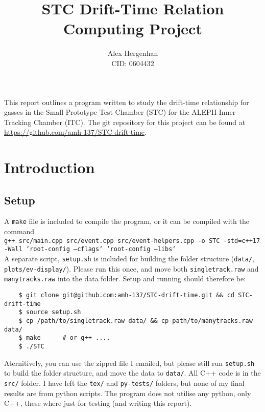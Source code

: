 \documentclass[11pt]{article}
\begin{document}
\title{STC Drift-Time Relation\\\normalsize Computing Project}
\author{Alex Hergenhan\\CID: 0604432}
\maketitle

This report outlines a program written to study the drift-time relationship for gasses in the Small Prototype Test Chamber (STC) for the ALEPH Inner Tracking Chamber (ITC). The git repository for this project can be found at \href{https://github.com/amh-137/STC-drift-time}{https://github.com/amh-137/STC-drift-time}.

\section{Introduction}
\label{sec:intro}

\subsection{Setup}
\label{sec:setup}
A \texttt{make} file is included to compile the program, or it can be compiled with the command\\

\texttt{g++ src/main.cpp src/event.cpp src/event-helpers.cpp -o STC -std=c++17 -Wall `root-config --cflags` `root-config --libs`}\\

A separate script, \texttt{setup.sh} is included for building the folder structure (\texttt{data/}, \texttt{plots/ev-display/}). Please run this once, and move both \texttt{singletrack.raw} and \texttt{manytracks.raw} into the data folder. Setup and running should therefore be:
\begin{verbatim}
    $ git clone git@github.com:amh-137/STC-drift-time.git && cd STC-drift-time
    $ source setup.sh
    $ cp /path/to/singletrack.raw data/ && cp path/to/manytracks.raw data/
    $ make      # or g++ ....
    $ ./STC
\end{verbatim}
Aternitively, you can use the zipped file I emailed, but please still run \texttt{setup.sh} to build the folder structure, and move the data to \texttt{data/}. All C++ code is in the \texttt{src/} folder. I have left the \texttt{tex/} and \texttt{py-tests/} folders, but none of my final results are from python scripts. The program does not utilise any python, only C++, these where just for testing (and writing this report).
\end{document}
